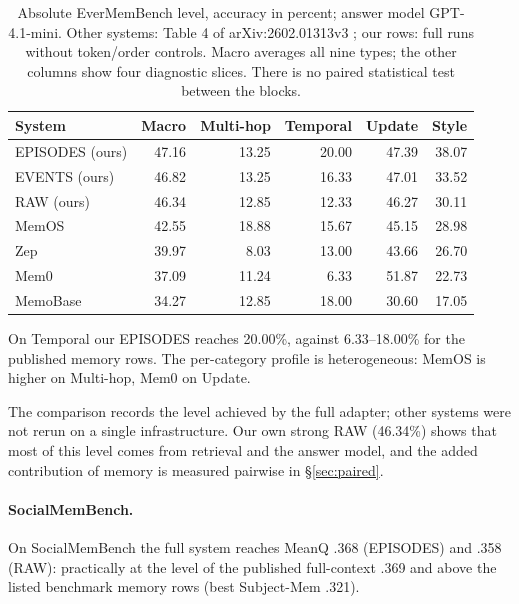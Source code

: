 \documentclass[11pt,a4paper]{article}
\newcommand{\raw}{RAW}
\newcommand{\events}{EVENTS}
\newcommand{\episodes}{EPISODES}
\begin{document}
\begin{table}[ht]
\centering\small
\begin{tabular}{@{}lrrrrr@{}}
\toprule
System & Macro & Multi-hop & Temporal & Update & Style\\
\midrule
\episodes{} (ours) & 47.16 & 13.25 & 20.00 & 47.39 & 38.07\\
\events{} (ours) & 46.82 & 13.25 & 16.33 & 47.01 & 33.52\\
\raw{} (ours) & 46.34 & 12.85 & 12.33 & 46.27 & 30.11\\
\midrule
MemOS & 42.55 & 18.88 & 15.67 & 45.15 & 28.98\\
Zep & 39.97 & 8.03 & 13.00 & 43.66 & 26.70\\
Mem0 & 37.09 & 11.24 & 6.33 & 51.87 & 22.73\\
MemoBase & 34.27 & 12.85 & 18.00 & 30.60 & 17.05\\
\bottomrule
\end{tabular}
\caption{Absolute EverMemBench level, accuracy in percent; answer model GPT-4.1-mini.
Other systems: Table 4 of arXiv:2602.01313v3 \citep{hu2026}; our rows: full runs
without token/order controls. Macro averages all nine types; the other columns show
four diagnostic slices. There is no paired statistical test between the blocks.}
\label{tab:ever-external}
\end{table}

On Temporal our \episodes{} reaches 20.00\%, against 6.33--18.00\% for the published
memory rows. The per-category profile is heterogeneous: MemOS is higher on
Multi-hop, Mem0 on Update.

The comparison records the level achieved by the full adapter; other systems were
not rerun on a single infrastructure. Our own strong \raw{} (46.34\%) shows that most
of this level comes from retrieval and the answer model, and the added contribution
of memory is measured pairwise in §\ref{sec:paired}.

\paragraph{SocialMemBench.}
On SocialMemBench the full system reaches MeanQ .368 (\episodes{}) and .358
(\raw{}): practically at the level of the published full-context .369 and above the
listed benchmark memory rows (best Subject-Mem .321).
\end{document}
